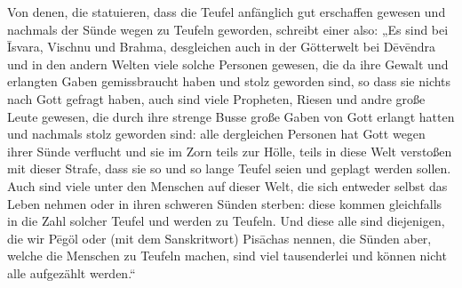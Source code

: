 \documentclass{article}
\begin{document}
Von denen, die statuieren, dass die Teufel anfänglich gut erschaffen gewesen und nachmals der Sünde wegen zu Teufeln geworden, schreibt einer also: „Es sind bei \={I}svara, Vischnu und Brahma, desgleichen auch in der Götterwelt bei D\={e}v\={e}ndra und in den andern Welten viele solche Personen gewesen, die da ihre Gewalt und erlangten Gaben gemissbraucht haben und stolz geworden sind, so dass sie nichts nach Gott gefragt haben, auch sind viele Propheten, Riesen und andre große Leute gewesen, die durch ihre strenge Busse große Gaben von Gott erlangt hatten und nachmals stolz geworden sind: alle dergleichen Personen hat Gott wegen ihrer Sünde verflucht und sie im Zorn teils zur Hölle, teils in diese Welt verstoßen mit dieser Strafe, dass sie so und so lange Teufel seien und geplagt werden sollen. Auch sind viele unter den Menschen auf dieser Welt, die sich entweder selbst das Leben nehmen oder in ihren schweren Sünden sterben: diese kommen gleichfalls in die Zahl solcher Teufel und werden zu Teufeln. Und diese alle sind diejenigen, die wir P\={e}göl oder (mit dem Sanskritwort) Pis\={a}chas nennen, die Sünden aber, welche die Menschen zu Teufeln machen, sind viel tausenderlei und können nicht alle aufgezählt werden.“
\end{document}
